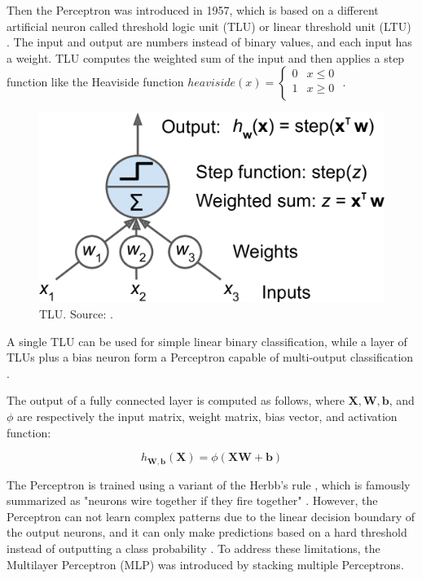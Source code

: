 \documentclass[a4paper, 11pt, oneside]{article}
\begin{document}
Then the Perceptron was introduced in 1957, which is based on a different artificial neuron called threshold logic unit
(TLU) or linear threshold unit (LTU) \cite{rosenblatt1957perceptron}. The input and output are numbers instead of
binary values, and each input has a weight. TLU computes the weighted sum of the input and then applies a step
function like the Heaviside function
$heaviside (x) =
\begin{cases}
  0 & x \le 0 \\
  1 & x \geq 0 \\
\end{cases}$
\cite{geron2019hands, rosenblatt1957perceptron}.

\begin{figure}[ht]
  \begin{center}
    \includegraphics[width=.5\textwidth]{tlu.png}
  \end{center}
  \caption{TLU. Source: \cite{geron2019hands}.}
\end{figure}

A single TLU can be used for simple linear binary classification, while a layer of TLUs plus a bias neuron form a
Perceptron capable of multi-output classification \cite{geron2019hands}.

The output of a fully connected layer is computed as follows, where $\mathbf{X}, \mathbf{W}, \mathbf{b}$, and $\phi$
are respectively the input matrix, weight matrix, bias vector, and activation function:

$$h_{\mathbf{W,b}}(\mathbf{X}) = \phi(\mathbf{XW} + \mathbf{b})$$

The Perceptron is trained using a variant of the Herbb's rule \cite{hebb2005organization}, which is famously summarized
as "neurons wire together if they fire together" \cite{lowel1992selection}. However, the Perceptron
can not learn complex patterns due to the linear decision boundary of the output neurons, and it can only make predictions
based on a hard threshold instead of outputting a class probability \cite{geron2019hands}. To address these limitations,
the Multilayer Perceptron (MLP) was introduced by stacking multiple Perceptrons.
\end{document}
